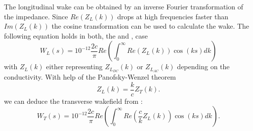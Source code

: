 The longitudinal wake can be obtained by an inverse Fourier transformation of the impedance. Since $Re(Z_L(k))$ drops at high frequencies faster than $Im(Z_L(k))$ the cosine transformation can be used to calculate the wake. The following equation holds in both, the  and , case
%
\begin{equation} \label{eq:Calc_Wl}
W_L(s)=10^{-12} \dfrac{2c}{\pi}Re\left(\int_0^\infty Re(Z_L(k))\cos (ks)dk\right)
\end{equation}
%
with $Z_L(k)$ either representing $Z_{L_{DC}}(k)$ or $Z_{L_{AC}}(k)$ depending on the conductivity. With help of the Panofsky-Wenzel theorem
%
\begin{equation}
Z_L(k) = \frac{k}{c}Z_T(k).
\end{equation}
%
we can deduce the transverse wakefield from :
%
\begin{equation} \label{eq:Calc_Wt}
W_T(s)= 10^{-12} \dfrac{2c}{\pi}Re\left(\int_0^\infty Re( \frac{c}{k}Z_L(k))\cos (ks)dk\right).
\end{equation}


